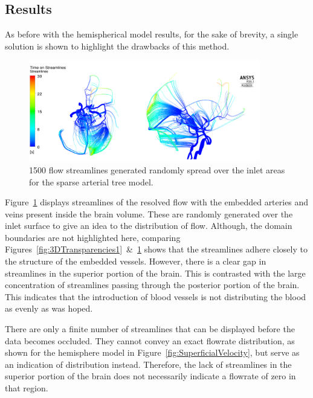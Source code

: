 \documentclass[11pt,english,a4paper,twoside,openright]{report}
\begin{document}
{{{{{{{{\subsection{Results}

As before with the hemispherical model results, for the sake of brevity, a single solution is shown to highlight the drawbacks of this method.

\begin{figure}[h]
	\centering
	\includegraphics[width=0.9\textwidth]{3DFullVessels/streamlines2}
	\caption[1500 flow streamlines generated randomly spread over the inlet areas for the sparse arterial tree model]{1500 flow streamlines generated randomly spread over the inlet areas for the sparse arterial tree model.}
	\label{fig:streamlines1}
\end{figure}

Figure~\ref{fig:streamlines1} displays streamlines of the resolved flow with the embedded arteries and veins present inside the brain volume. These are randomly generated over the inlet surface to give an idea to the distribution of flow. Although, the domain boundaries are not highlighted here, comparing Figures~\ref{fig:3DTransparencies1}~\&~\ref{fig:streamlines1} shows that the streamlines adhere closely to the structure of the embedded vessels. However, there is a clear gap in streamlines in the superior portion of the brain. This is contrasted with the large concentration of streamlines passing through the posterior portion of the brain. This indicates that the introduction of blood vessels is not distributing the blood as evenly as was hoped.

There are only a finite number of streamlines that can be displayed before the data becomes occluded. They cannot convey an exact flowrate distribution, as shown for the hemisphere model in Figure~\ref{fig:SuperficialVelocity}, but serve as an indication of distribution instead. Therefore, the lack of streamlines in the superior portion of the brain does not necessarily indicate a flowrate of zero in that region.  

}}}}}}}}
\end{document}
